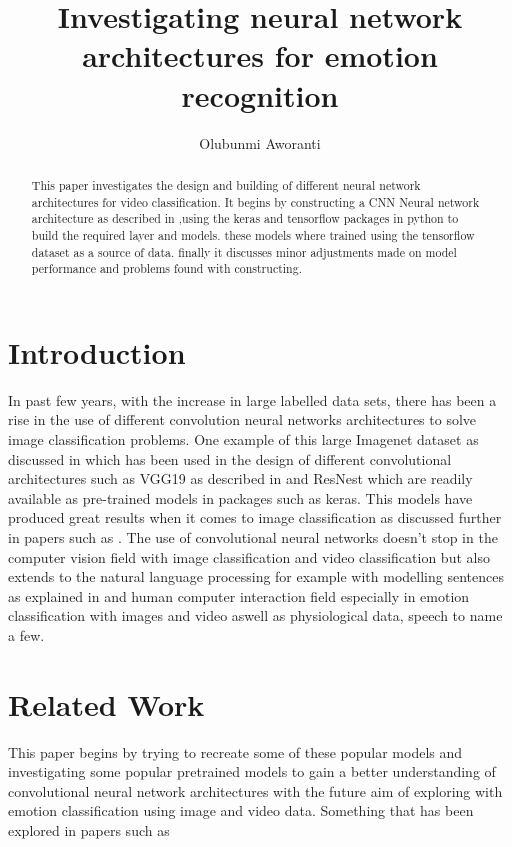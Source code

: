 \documentclass{article}
\title{Investigating neural network architectures for emotion recognition}
\author{Olubunmi Aworanti}
\date{}
\begin{document}
    \begin{abstract}
        This paper investigates the design and building of different neural network architectures for video classification. It begins by constructing a CNN Neural network architecture as described in \citep{KarpathyCVPR14},using the keras and tensorflow packages in python to build the required layer and models. these models where trained using the tensorflow dataset as a source of data. finally it discusses minor adjustments made on model performance and problems found with constructing.
    \end{abstract}

    \maketitle

    \section{Introduction}
    In past few years, with the increase in large labelled data sets, there has been a rise in the use of different convolution neural networks architectures to solve image classification problems. One example of this large Imagenet dataset as discussed in \cite{JiaDeng2009IAlh} which has been used in the design of different convolutional architectures such as VGG19 as described in \cite{simonyan2014deep} and ResNest \cite{He_2016} which are readily available as pre-trained models in packages such as keras.
    This models have produced great results when it comes to image classification as discussed further in papers such as \cite{MISHKIN201711}. The use of convolutional neural networks doesn't  stop in the computer vision field with image classification and video classification but also extends to the natural language processing for example with modelling sentences as explained in \cite{Kalchbrenner_2014} and human computer interaction field especially in emotion classification with images and video \cite{knyazev2017convolutional} aswell as  physiological data, speech to name a few.


    \section{Related Work}

    This paper begins by trying to recreate some of these popular models and investigating some popular pretrained models to gain a better understanding of convolutional neural network architectures with the future aim of exploring with emotion classification using image and video data. Something that has been explored in papers such as \cite{SUN201836}
\end{document}
